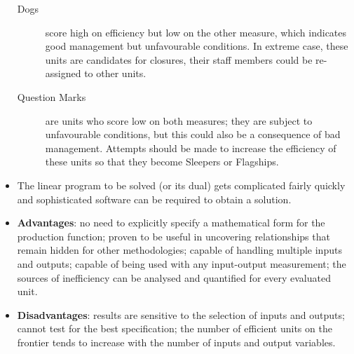 \begin{itemize}[noitemsep]
\begin{description}
\item[Dogs] score high on efficiency but low on the other measure, which indicates good management but unfavourable conditions. In extreme case, these units are candidates for closures, their staff members could be re-assigned to other units.  
\item[Question Marks] are units who score low on both measures; they are subject to unfavourable conditions, but this could also be a consequence of bad management. Attempts should be made to increase the efficiency of these units so that they become Sleepers or Flagships. 
\end{description}
\item The linear program to be solved (or its dual) gets complicated fairly quickly and  sophisticated software can be required to obtain a solution.  
\item \textbf{Advantages}: no need to explicitly specify a mathematical form for the production function; proven to be useful in uncovering relationships that remain hidden for other methodologies; capable of handling multiple inputs and outputs; capable of being used with any input-output measurement; the sources of inefficiency can be analysed and quantified for every evaluated unit.
\item \textbf{Disadvantages}: results are sensitive to the selection of inputs and outputs; cannot test for the best specification; the number of efficient units on the frontier tends to increase with the number of inputs and output variables.
    \end{itemize}
